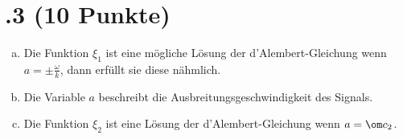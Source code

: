 \section*{\nr.3 \titthree (10 Punkte)}
\begin{enumerate}[(a)]
\item Die Funktion $\xi_1$ ist eine mögliche Lösung der d'Alembert-Gleichung wenn $a=\pm \frac{\omega}{k}$, dann erfüllt sie diese nähmlich.
\item Die Variable $a$ beschreibt die Ausbreitungsgeschwindigkeit des Signals.
\item Die Funktion $\xi_2$ ist eine Lösung der d'Alembert-Gleichung wenn $a=\om c_2$.    
\end{enumerate}